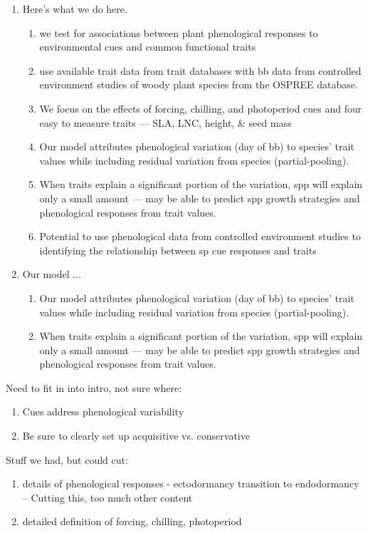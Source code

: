 \documentclass{article}
\begin{document}
\begin{enumerate}
\item Here's what we do here. %
\begin{enumerate}
\item we test for associations between plant phenological responses to environmental cues and common functional traits 
\item use available trait data from trait databases with bb data from controlled environment studies of woody plant species from the OSPREE database.
\item We focus on the effects of forcing, chilling, and photoperiod cues and four easy to measure traits — SLA, LNC, height, \& seed mass
\item Our model attributes phenological variation (day of bb) to species’ trait values while including residual variation from species (partial-pooling).
\item When traits explain a significant portion of the variation, spp will explain only a small amount — may be able to predict spp growth strategies and phenological responses from trait values.
\item Potential to use phenological data from controlled environment studies to identifying the relationship between sp cue responses and traits
\end{enumerate}

\item Our model ...
\begin{enumerate}
\item Our model attributes phenological variation (day of bb) to species’ trait values while including residual variation from species (partial-pooling).
\item When traits explain a significant portion of the variation, spp will explain only a small amount — may be able to predict spp growth strategies and phenological responses from trait values.
\end{enumerate}
\end{enumerate}

Need to fit in into intro, not sure where:
\begin{enumerate}
\item Cues address phenological variability
\item Be sure to clearly set up acquisitive vs. conservative
\end{enumerate}

Stuff we had, but could cut:
\begin{enumerate}
\item details of phenological responses - ectodormancy transition to endodormancy -- Cutting this, too much other content
\item detailed definition of forcing, chilling, photoperiod
\end{enumerate}
\end{document}
